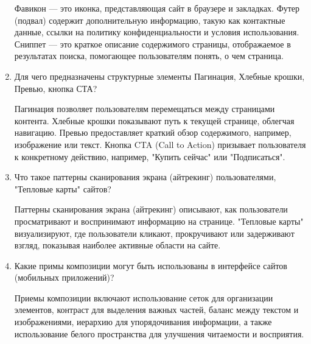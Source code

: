 \begin{enumerate}
    Фавикон — это иконка, представляющая сайт в браузере и закладках. Футер (подвал) содержит дополнительную информацию, такую как контактные данные, ссылки на политику конфиденциальности и условия использования. Сниппет — это краткое описание содержимого страницы, отображаемое в результатах поиска, помогающее пользователям понять, о чем страница.
    \item Для чего предназначены структурные элементы Пагинация, Хлебные крошки, Превью, кнопка СТА?

    Пагинация позволяет пользователям перемещаться между страницами контента. Хлебные крошки показывают путь к текущей странице, облегчая навигацию. Превью предоставляет краткий обзор содержимого, например, изображение или текст. Кнопка CTA (Call to Action) призывает пользователя к конкретному действию, например, "Купить сейчас" или "Подписаться".
    \item Что такое паттерны сканирования экрана (айтрекинг) пользователями, "Тепловые карты" сайтов?

    Паттерны сканирования экрана (айтрекинг) описывают, как пользователи просматривают и воспринимают информацию на странице. "Тепловые карты" визуализируют, где пользователи кликают, прокручивают или задерживают взгляд, показывая наиболее активные области на сайте.
    \item Какие примы композиции могут быть использованы в интерфейсе сайтов (мобильных приложений)?

    Приемы композиции включают использование сеток для организации элементов, контраст для выделения важных частей, баланс между текстом и изображениями, иерархию для упорядочивания информации, а также использование белого пространства для улучшения читаемости и восприятия.
\end{enumerate}


